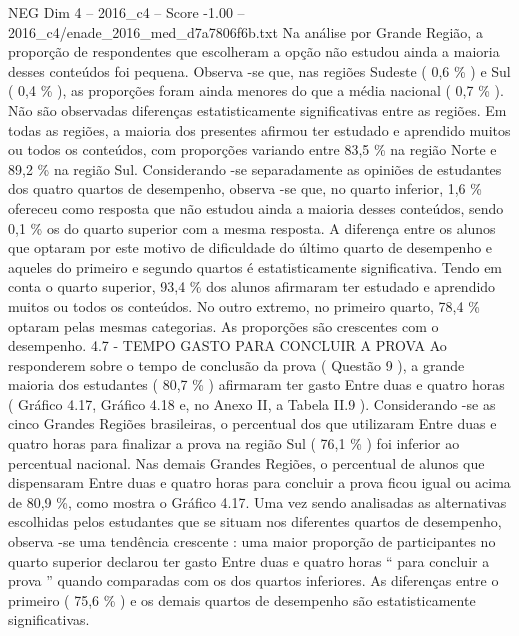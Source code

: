 \begin{textsample}{NEG Dim 4 – 2016\_c4 – Score -1.00 – 2016\_c4/enade\_2016\_med\_d7a7806f6b.txt}
Na análise por Grande Região, a proporção de respondentes que escolheram a opção não estudou ainda a maioria desses conteúdos foi pequena.
Observa -se que, nas regiões Sudeste ( 0,6 \% ) e Sul ( 0,4 \% ), as proporções foram ainda menores do que a média nacional ( 0,7 \% ).
Não são observadas diferenças estatisticamente significativas entre as regiões.
Em todas as regiões, a maioria dos presentes afirmou ter estudado e aprendido muitos ou todos os conteúdos, com proporções variando entre 83,5 \% na região Norte e 89,2 \% na região Sul.
Considerando -se separadamente as opiniões de estudantes dos quatro quartos de desempenho, observa -se que, no quarto inferior, 1,6 \% ofereceu como resposta que não estudou ainda a maioria desses conteúdos, sendo 0,1 \% os do quarto superior com a mesma resposta.
A diferença entre os alunos que optaram por este motivo de dificuldade do último quarto de desempenho e aqueles do primeiro e segundo quartos é estatisticamente significativa.
Tendo em conta o quarto superior, 93,4 \% dos alunos afirmaram ter estudado e aprendido muitos ou todos os conteúdos.
No outro extremo, no primeiro quarto, 78,4 \% optaram pelas mesmas categorias.
As proporções são crescentes com o desempenho. 4.7 - TEMPO GASTO PARA CONCLUIR A PROVA Ao responderem sobre o tempo de conclusão da prova ( Questão 9 ), a grande maioria dos estudantes ( 80,7 \% ) afirmaram ter gasto Entre duas e quatro horas ( Gráfico 4.17, Gráfico 4.18 e, no Anexo II, a Tabela II.9 ).
Considerando -se as cinco Grandes Regiões brasileiras, o percentual dos que utilizaram Entre duas e quatro horas para finalizar a prova na região Sul ( 76,1 \% ) foi inferior ao percentual nacional.
Nas demais Grandes Regiões, o percentual de alunos que dispensaram Entre duas e quatro horas para concluir a prova ficou igual ou acima de 80,9 \%, como mostra o Gráfico 4.17.
Uma vez sendo analisadas as alternativas escolhidas pelos estudantes que se situam nos diferentes quartos de desempenho, observa -se uma tendência crescente : uma maior proporção de participantes no quarto superior declarou ter gasto Entre duas e quatro horas “ para concluir a prova ” quando comparadas com os dos quartos inferiores.
As diferenças entre o primeiro ( 75,6 \% ) e os demais quartos de desempenho são estatisticamente significativas.

\end{textsample}

